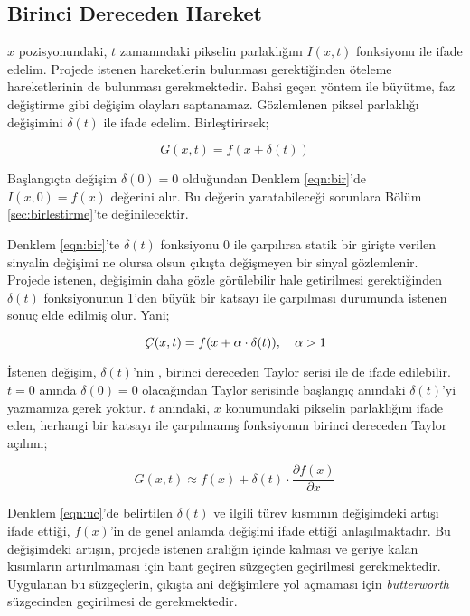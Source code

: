 \documentclass[a4paper, 12pt]{article}
\begin{document}
\subsection{Birinci Dereceden Hareket}{\label{birinci-dereceden}}
$x$ pozisyonundaki, $t$ zamanındaki pikselin parlaklığını $I(x,t)$ fonksiyonu ile ifade edelim. Projede istenen hareketlerin bulunması gerektiğinden öteleme hareketlerinin de bulunması gerekmektedir. Bahsi geçen yöntem ile büyütme, faz değiştirme gibi değişim olayları saptanamaz. Gözlemlenen piksel parlaklığı değişimini $\delta(t)$ ile ifade edelim. Birleştirirsek; 

\begin{equation}
\label{eqn:bir}
G(x,t) = f(x+\delta(t)) 
\end{equation}

Başlangıçta değişim $\delta(0)=0$ olduğundan Denklem \ref{eqn:bir}'de $I(x,0) = f(x)$ değerini alır. Bu değerin yaratabileceği sorunlara Bölüm \ref{sec:birlestirme}'te değinilecektir.

Denklem \ref{eqn:bir}'te $\delta(t)$ fonksiyonu $0$ ile çarpılırsa statik bir girişte verilen sinyalin değişimi ne olursa olsun çıkışta değişmeyen bir sinyal gözlemlenir. Projede istenen, değişimin daha gözle görülebilir hale getirilmesi gerektiğinden $\delta(t)$ fonksiyonunun 1'den büyük bir katsayı ile çarpılması durumunda istenen sonuç elde edilmiş olur. Yani;

\begin{equation}
\label{eqn:iki}
	\text{\textit{Ç}}(x,t) = f(x+\alpha \cdot \delta(t)), \quad \alpha > 1 
\end{equation}

İstenen değişim, $\delta(t)$'nin , birinci dereceden Taylor serisi ile de ifade edilebilir. $t=0$ anında $\delta(0)=0$ olacağından Taylor serisinde başlangıç anındaki $\delta(t)$'yi yazmamıza gerek yoktur. $t$ anındaki, $x$ konumundaki pikselin parlaklığını ifade eden, herhangi bir katsayı ile çarpılmamış fonksiyonun birinci dereceden Taylor açılımı;

\begin{equation}
\label{eqn:uc}
	G(x,t) \approx f(x) + \delta(t) \cdot\frac{\partial f(x)}{\partial x}
\end{equation}

Denklem \ref{eqn:uc}'de belirtilen $\delta(t)$ ve ilgili türev kısmının değişimdeki artışı ifade ettiği, $f(x)$'in de genel anlamda değişimi ifade ettiği anlaşılmaktadır. Bu değişimdeki artışın, projede istenen aralığın içinde kalması ve geriye kalan kısımların artırılmaması için bant geçiren süzgeçten geçirilmesi gerekmektedir. Uygulanan bu süzgeçlerin, çıkışta ani değişimlere yol açmaması için \textit{butterworth} süzgecinden geçirilmesi de gerekmektedir.
\end{document}
